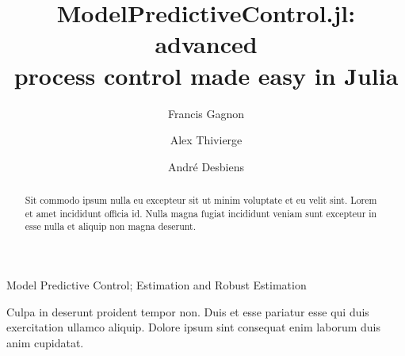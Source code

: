 \documentclass{ifacconf}
\begin{document}
\begin{frontmatter}

\title{ModelPredictiveControl.jl: advanced\\process control made easy in Julia}

\author[First]{Francis Gagnon} 
\author[First]{Alex Thivierge} 
\author[Second]{André Desbiens}

\address[First]{Jumine Inc., Quebec City, G1S 2K4, Canada}
\address[Second]{Process Observation and Optimization Laboratory (LOOP), Université Laval, Quebec City, G1V 0A6, Canada}

\begin{abstract} 
Sit commodo ipsum nulla eu excepteur sit ut minim voluptate et eu velit sint. Lorem et amet incididunt officia id. Nulla magna fugiat incididunt veniam sunt excepteur in esse nulla et aliquip non magna deserunt. 
\end{abstract}

\begin{keyword}
Model Predictive Control; Estimation and Robust Estimation
\end{keyword}

\end{frontmatter}






\begin{ack}
Culpa in deserunt proident tempor non. Duis et esse pariatur esse qui duis exercitation ullamco aliquip. Dolore ipsum sint consequat enim laborum duis anim cupidatat.
\end{ack}


\end{document}
